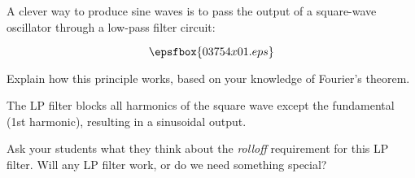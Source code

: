 

A clever way to produce sine waves is to pass the output of a square-wave oscillator through a low-pass filter circuit:

$$\epsfbox{03754x01.eps}$$

Explain how this principle works, based on your knowledge of Fourier's theorem.







The LP filter blocks all harmonics of the square wave except the fundamental (1st harmonic), resulting in a sinusoidal output.







Ask your students what they think about the {\it rolloff} requirement for this LP filter.  Will any LP filter work, or do we need something special?




